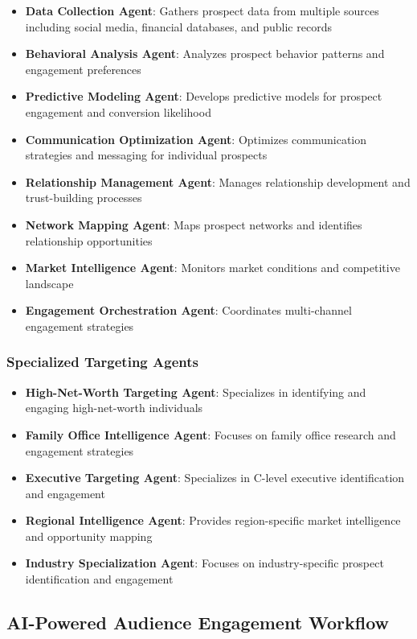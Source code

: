 \begin{itemize}
    \item \textbf{Data Collection Agent}: Gathers prospect data from multiple sources including social media, financial databases, and public records
    \item \textbf{Behavioral Analysis Agent}: Analyzes prospect behavior patterns and engagement preferences
    \item \textbf{Predictive Modeling Agent}: Develops predictive models for prospect engagement and conversion likelihood
    \item \textbf{Communication Optimization Agent}: Optimizes communication strategies and messaging for individual prospects
    \item \textbf{Relationship Management Agent}: Manages relationship development and trust-building processes
    \item \textbf{Network Mapping Agent}: Maps prospect networks and identifies relationship opportunities
    \item \textbf{Market Intelligence Agent}: Monitors market conditions and competitive landscape
    \item \textbf{Engagement Orchestration Agent}: Coordinates multi-channel engagement strategies
\end{itemize}

\subsubsection{Specialized Targeting Agents}

\begin{itemize}
    \item \textbf{High-Net-Worth Targeting Agent}: Specializes in identifying and engaging high-net-worth individuals
    \item \textbf{Family Office Intelligence Agent}: Focuses on family office research and engagement strategies
    \item \textbf{Executive Targeting Agent}: Specializes in C-level executive identification and engagement
    \item \textbf{Regional Intelligence Agent}: Provides region-specific market intelligence and opportunity mapping
    \item \textbf{Industry Specialization Agent}: Focuses on industry-specific prospect identification and engagement
\end{itemize}

\subsection{AI-Powered Audience Engagement Workflow}

